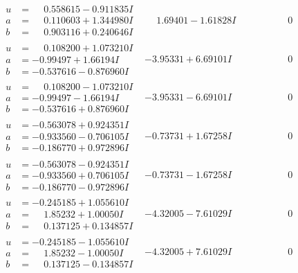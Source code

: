 \documentclass[1p]{elsarticle_modified}
\theoremstyle{definition}
\begin{document}
$$\begin{array}{c|c|c}
\begin{aligned}
u &= \phantom{-}0.558615 - 0.911835 I \\
a &= \phantom{-}0.110603 + 1.344980 I \\
b &= \phantom{-}0.903116 + 0.240646 I\end{aligned}
 & \phantom{-}1.69401 - 1.61828 I & \phantom{-0.000000 } 0 \\ \hline\begin{aligned}
u &= \phantom{-}0.108200 + 1.073210 I \\
a &= -0.99497 + 1.66194 I \\
b &= -0.537616 - 0.876960 I\end{aligned}
 & -3.95331 + 6.69101 I & \phantom{-0.000000 } 0 \\ \hline\begin{aligned}
u &= \phantom{-}0.108200 - 1.073210 I \\
a &= -0.99497 - 1.66194 I \\
b &= -0.537616 + 0.876960 I\end{aligned}
 & -3.95331 - 6.69101 I & \phantom{-0.000000 } 0 \\ \hline\begin{aligned}
u &= -0.563078 + 0.924351 I \\
a &= -0.933560 - 0.706105 I \\
b &= -0.186770 + 0.972896 I\end{aligned}
 & -0.73731 + 1.67258 I & \phantom{-0.000000 } 0 \\ \hline\begin{aligned}
u &= -0.563078 - 0.924351 I \\
a &= -0.933560 + 0.706105 I \\
b &= -0.186770 - 0.972896 I\end{aligned}
 & -0.73731 - 1.67258 I & \phantom{-0.000000 } 0 \\ \hline\begin{aligned}
u &= -0.245185 + 1.055610 I \\
a &= \phantom{-}1.85232 + 1.00050 I \\
b &= \phantom{-}0.137125 + 0.134857 I\end{aligned}
 & -4.32005 - 7.61029 I & \phantom{-0.000000 } 0 \\ \hline\begin{aligned}
u &= -0.245185 - 1.055610 I \\
a &= \phantom{-}1.85232 - 1.00050 I \\
b &= \phantom{-}0.137125 - 0.134857 I\end{aligned}
 & -4.32005 + 7.61029 I & \phantom{-0.000000 } 0 \\ \hline\begin{aligned}

\end{aligned}
\end{array}$$
\end{document}
